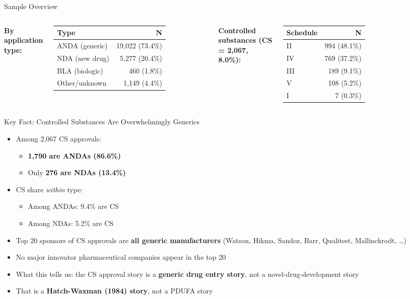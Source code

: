 \documentclass[10pt]{beamer}
\begin{document}
\begin{frame}[t]{Sample Overview}
  \begin{columns}[t]
    \textbf{By application type:}
    \medskip
    \begin{tabular}{lr}
      \toprule
      Type & N \\
      \midrule
      ANDA (generic)   & 19,022 (73.4\%) \\
      NDA (new drug)   & 5,277  (20.4\%) \\
      BLA (biologic)   & 460    (1.8\%)  \\
      Other/unknown    & 1,149  (4.4\%)  \\
      \bottomrule
    \end{tabular}
    \textbf{Controlled substances (CS = 2,067, 8.0\%):}
    \medskip
    \begin{tabular}{lr}
      \toprule
      Schedule & N \\
      \midrule
      II   & 994 (48.1\%) \\
      IV   & 769 (37.2\%) \\
      III  & 189 (9.1\%)  \\
      V    & 108 (5.2\%)  \\
      I    &  7  (0.3\%)  \\
      \bottomrule
    \end{tabular}
  \end{columns}
\end{frame}

\begin{frame}[t]{Key Fact: Controlled Substances Are Overwhelmingly Generics}
  \begin{itemize}
    \item Among 2,067 CS approvals:
          \begin{itemize}
            \item \textbf{1,790 are ANDAs (86.6\%)}
            \item Only \textbf{276 are NDAs (13.4\%)}
          \end{itemize}
    \item CS share \textit{within} type:
          \begin{itemize}
            \item Among ANDAs: 9.4\% are CS
            \item Among NDAs: 5.2\% are CS
          \end{itemize}
    \item Top 20 sponsors of CS approvals are \textbf{all generic manufacturers}
          (Watson, Hikma, Sandoz, Barr, Qualitest, Mallinckrodt, \ldots)
    \item No major innovator pharmaceutical companies appear in the top 20
    \item \alert{What this tells us:} the CS approval story is a
          \textbf{generic drug entry story}, not a novel-drug-development story
    \item That is a \textbf{Hatch-Waxman (1984) story}, not a PDUFA story
  \end{itemize}
\end{frame}
\end{document}
